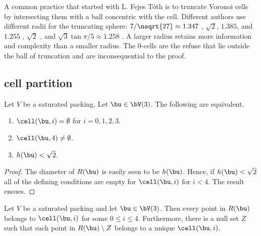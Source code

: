 A common practice that started with L. Fejes T\'oth is to truncate
 Voronoi cells by
intersecting them with a ball concentric with the cell.  
Different authors use different radii for the
truncating sphere: $7/\nsqrt{27}\approx 1.347$ \cite{Fej53},
$\sqrt2$, $1.385$, and $1.255$ \cite{Hales:2006:DCG},  $\sqrt2$ \cite{marchal:2009},
and $\sqrt{3}\tan{\pi/5}\approx 1.258$ \cite{Hales:2010:Dodec}.  A larger radius
retains more information and complexity than a smaller radius.
The $0$-cells are the refuse that lie outside the ball of
truncation and are inconsequential to the proof.


\bigskip
\subsection{cell partition}

\begin{lemma}[]\label{lemma:M-complement4} 
Let $V$ be a saturated packing.  Let $\bu\in \bV(3)$.
The following  are equivalent.
\begin{enumerate} 
\item  $\cell(\bu,i)=\emptyset$ for $i=0,1,2,3$.
\item  $\cell(\bu,4)\ne\emptyset$.
\item  $h(\bu)<\sqrt2$.
\end{enumerate}
\end{lemma}

\begin{proof} 
  The diameter of $R(\bu)$ is easily seen to be $h(\bu)$.  Hence, if
  $h(\bu)<\sqrt2$ all of the defining conditions are empty for
  $\cell(\bu,i)$ for $i<4$.  The result ensues.
\end{proof}

\begin{lemma}[]\label{lemma:M-exhaust} 
  Let $V$ be a saturated packing and let $\bu\in \bV(3)$. Then
  every point in $R(\bu)$ belongs to $\cell(\bu,i)$ for some $0\le
  i\le 4$.  Furthermore, there is a null set $Z$ such that each point
  in $R(\bu)\setminus Z$ belongs to a unique $\cell(\bu,i)$.
\end{lemma}

